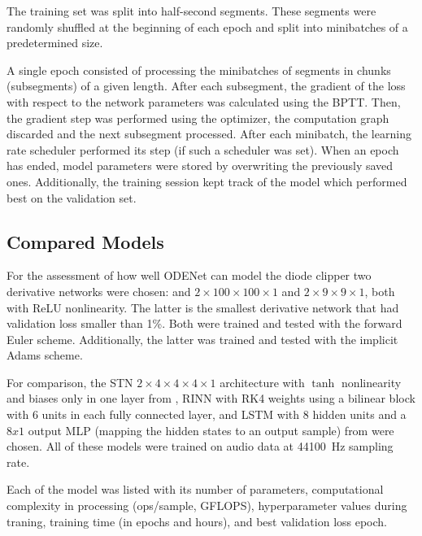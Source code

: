 The training set was split into half-second segments. These segments were randomly shuffled at the beginning of each epoch and split into minibatches of a predetermined size.

A single epoch consisted of processing the minibatches of segments in chunks (subsegments) of a given length. After each subsegment, the gradient of the loss with respect to the network parameters was calculated using the \ac{BPTT}. Then, the gradient step was performed using the optimizer, the computation graph discarded and the next subsegment processed. After each minibatch, the learning rate scheduler performed its step (if such a scheduler was set). When an epoch has ended, model parameters were stored by overwriting the previously saved ones. Additionally, the training session kept track of the model which performed best on the validation set.

\subsection{Compared Models}
\label{sec:diode_clipper_models}

For the assessment of how well ODENet can model the diode clipper two derivative networks were chosen: and $2 \times 100 \times 100 \times 1$ and $2 \times 9 \times 9 \times 1$, both with \ac{ReLU} nonlinearity. The latter is the smallest derivative network that had validation loss smaller than 1\%. Both were trained and tested with the forward Euler scheme. Additionally, the latter was trained and tested with the implicit Adams scheme.

For comparison, the \ac{STN} $2 \times 4 \times 4 \times 4 \times 1$ architecture with $\tanh$ nonlinearity and biases only in one layer from \cite{Parker2019}, \ac{RINN} with \ac{RK}4 weights using a bilinear block with 6 units in each fully connected layer, and \ac{LSTM} with 8 hidden units and a $8 x 1$ output \ac{MLP} (mapping the hidden states to an output sample) from \cite{Wright2019} were chosen. All of these models were trained on audio data at \SI{44100}{Hz} sampling rate.

Each of the model was listed with its number of parameters, computational complexity in processing (ops/sample, GFLOPS), hyperparameter values during traning, training time (in epochs and hours), and best validation loss epoch.  %
\begin{table}[]
    
\end{table}

